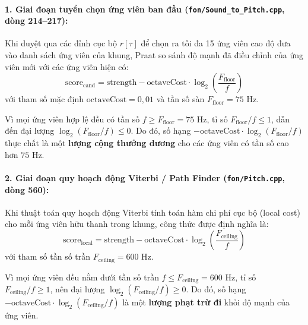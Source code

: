 \paragraph{1. Giai đoạn tuyển chọn ứng viên ban đầu (\texttt{fon/Sound\_to\_Pitch.cpp}, dòng 214--217):}
Khi duyệt qua các đỉnh cục bộ $r[\tau]$ để chọn ra tối đa 15 ứng viên cao độ đưa vào danh sách ứng viên của khung, Praat so sánh độ mạnh đã điều chỉnh của ứng viên mới với các ứng viên hiện có:
\begin{equation}
\text{score}_{\text{cand}} = \text{strength} - \text{octaveCost} \cdot \log_2\left(\frac{F_{\text{floor}}}{f}\right)
\label{eq:ch08_cost_floor}
\end{equation}
với tham số mặc định $\text{octaveCost} = 0{,}01$ và tần số sàn $F_{\text{floor}} = 75\text{ Hz}$. 

Vì mọi ứng viên hợp lệ đều có tần số $f \ge F_{\text{floor}} = 75\text{ Hz}$, tỉ số $F_{\text{floor}} / f \le 1$, dẫn đến đại lượng $\log_2(F_{\text{floor}} / f) \le 0$. Do đó, số hạng $-\text{octaveCost} \cdot \log_2(F_{\text{floor}} / f)$ thực chất là một \textbf{lượng cộng thưởng dương} cho các ứng viên có tần số cao hơn $75\text{ Hz}$.

\paragraph{2. Giai đoạn quy hoạch động Viterbi / Path Finder (\texttt{fon/Pitch.cpp}, dòng 560):}
Khi thuật toán quy hoạch động Viterbi tính toán hàm chi phí cục bộ (local cost) cho mỗi ứng viên hữu thanh trong khung, công thức được định nghĩa là:
\begin{equation}
\text{score}_{\text{local}} = \text{strength} - \text{octaveCost} \cdot \log_2\left(\frac{F_{\text{ceiling}}}{f}\right)
\label{eq:ch08_cost_ceiling}
\end{equation}
với tham số tần số trần $F_{\text{ceiling}} = 600\text{ Hz}$.

Vì mọi ứng viên đều nằm dưới tần số trần $f \le F_{\text{ceiling}} = 600\text{ Hz}$, tỉ số $F_{\text{ceiling}} / f \ge 1$, nên đại lượng $\log_2(F_{\text{ceiling}} / f) \ge 0$. Do đó, số hạng $-\text{octaveCost} \cdot \log_2(F_{\text{ceiling}} / f)$ là một \textbf{lượng phạt trừ đi} khỏi độ mạnh của ứng viên.


